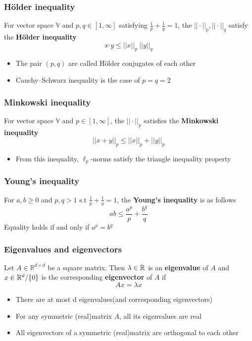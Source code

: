 \begin{frame}\frametitle{Hölder inequality}
    For vector space $\mathbb{V}$ and $p,q\in[1,\infty]$ satisfying $\frac{1}{p}+\frac{1}{q}=1$, the
    $||\cdot||_p, ||\cdot||_q$ satisfy the \textbf{Hölder inequality}
    \begin{equation*}
        x\boldsymbol{\cdot}y\leq ||x||_p\ ||y||_q
    \end{equation*}
    \vspace*{5mm}
    \begin{itemize}
        \item The pair $(p,q)$ are called Hölder conjugates of each other
        \item Cauchy–Schwarz inequality is the case of $p=q=2$
    \end{itemize}
\end{frame}

\begin{frame}\frametitle{Minkowski inequality}
    For vector space $\mathbb{V}$ and $p\in[1,\infty]$, the
    $||\cdot||_p$ satisfies the \textbf{Minkowski inequality}
    \begin{equation*}
        ||x+y||_p\leq ||x||_p+||y||_p
    \end{equation*}
    \vspace*{5mm}
    \begin{itemize}
        \item From this inequality, $\ell_p$-norms satisfy the triangle inequality property
    \end{itemize}
\end{frame}

\begin{frame}\frametitle{Young's inequality}
    For $a,b\geq 0$ and $p,q>1$ s.t $\frac{1}{p}+\frac{1}{q}=1$, the \textbf{Young's inequality} is as follows
    \begin{equation*}
        ab\leq\frac{a^p}{p}+\frac{b^q}{q}
    \end{equation*}
    Equality holds if and only if $a^p=b^q$
\end{frame}

\begin{frame}\frametitle{Eigenvalues and eigenvectors}
    Let $A\in\mathbb{R}^{d\times d}$ be a square matrix. Then $\lambda\in{\mathbb R}^{}$ is an \textbf{eigenvalue} of $A$ and $x\in{\mathbb R}^{d}/\{0\}$
    is the corresponding \textbf{eigenvector} of $A$ if
    \begin{equation*}
       Ax=\lambda x
    \end{equation*}
    \vspace*{2mm}
    \begin{itemize}
        \item There are at most d eigenvalues(and corresponding eigenvectors)
        \item For any symmetric (real)matrix $A$, all its eigenvalues are real
        \item All eigenvectors of a symmetric (real)matrix are orthogonal to each other
    \end{itemize}
\end{frame}

